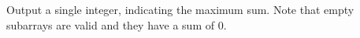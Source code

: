 Output a single integer, indicating the maximum sum. Note that empty subarrays are valid and they have a sum of 0.